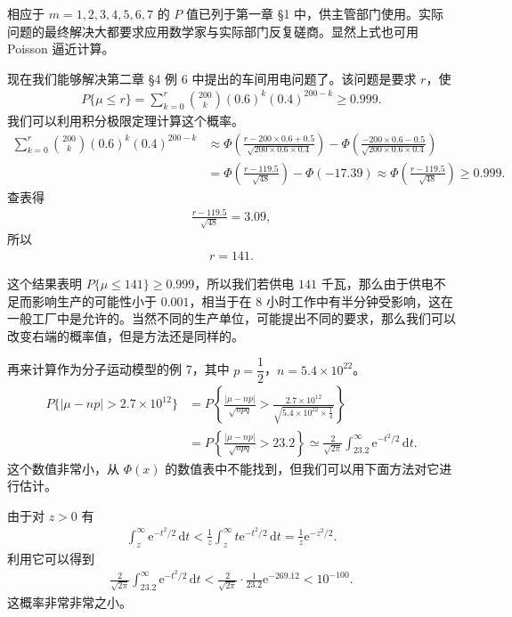 \documentclass[../../main.tex]{subfiles}
\begin{document}
相应于 $m=1,2,3,4,5,6,7$ 的 $P$ 值已列于第一章 \S1 中，供主管部门使用。实际问题的最终解决大都要求应用数学家与实际部门反复磋商。显然上式也可用 Poisson 逼近计算。

现在我们能够解决第二章 \S4 例 6 中提出的车间用电问题了。该问题是要求 $r$，使
\begin{align}
P\{\mu\leqslant r\}=\sum_{k=0}^{r}\binom{200}{k}(0.6)^{k}(0.4)^{200-k}\geqslant 0.999.
\end{align}
我们可以利用积分极限定理计算这个概率。
\begin{align*}
\sum_{k=0}^{r}\binom{200}{k}(0.6)^{k}(0.4)^{200-k}
&\approx\Phi\!\left(\frac{r-200\times0.6+0.5}{\sqrt{200\times0.6\times0.4}}\right)-\Phi\!\left(\frac{-200\times0.6-0.5}{\sqrt{200\times0.6\times0.4}}\right)\\
&=\Phi\!\left(\frac{r-119.5}{\sqrt{48}}\right)-\Phi(-17.39)\approx\Phi\!\left(\frac{r-119.5}{\sqrt{48}}\right)\geqslant 0.999.
\end{align*}
查表得
\begin{align*}
\frac{r-119.5}{\sqrt{48}}=3.09,
\end{align*}
所以
\begin{align*}
r=141.
\end{align*}

这个结果表明 $P\{\mu\leqslant141\}\geqslant0.999$，所以我们若供电 $141$ 千瓦，那么由于供电不足而影响生产的可能性小于 $0.001$，相当于在 $8$ 小时工作中有半分钟受影响，这在一般工厂中是允许的。当然不同的生产单位，可能提出不同的要求，那么我们可以改变右端的概率值，但是方法还是同样的。

再来计算作为分子运动模型的例 7，其中 $p=\dfrac12$，$n=5.4\times10^{22}$。
\begin{align*}
P\{|\mu-np|>2.7\times10^{12}\}
&=P\!\left\{\frac{|\mu-np|}{\sqrt{npq}}>\frac{2.7\times10^{12}}{\sqrt{5.4\times10^{22}\times\frac14}}\right\}\\
&=P\!\left\{\frac{|\mu-np|}{\sqrt{npq}}>23.2\right\}\simeq\frac{2}{\sqrt{2\pi}}\int_{23.2}^{\infty}\mathrm{e}^{-t^{2}/2}\,\mathrm{d}t.
\end{align*}
这个数值非常小，从 $\Phi(x)$ 的数值表中不能找到，但我们可以用下面方法对它进行估计。

由于对 $z>0$ 有
\begin{align}
\int_{z}^{\infty}\mathrm{e}^{-t^{2}/2}\,\mathrm{d}t<\frac1z\int_{z}^{\infty}t\mathrm{e}^{-t^{2}/2}\,\mathrm{d}t=\frac1z\mathrm{e}^{-z^{2}/2}.
\end{align}
利用它可以得到
\begin{align*}
\frac{2}{\sqrt{2\pi}}\int_{23.2}^{\infty}\mathrm{e}^{-t^{2}/2}\,\mathrm{d}t
<\frac{2}{\sqrt{2\pi}}\cdot\frac{1}{23.2}\mathrm{e}^{-269.12}<10^{-100}.
\end{align*}
这概率非常非常之小。
\end{document}

